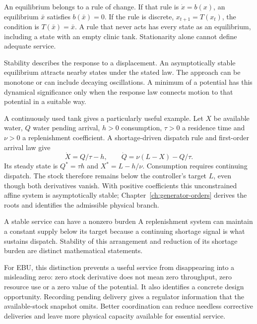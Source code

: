 An equilibrium belongs to a rule of change. If that rule is $\dot x=b(x)$, an equilibrium $\bar x$ satisfies $b(\bar x)=0$. If the rule is discrete, $x_{t+1}=T(x_t)$, the condition is $T(\bar x)=\bar x$. A rule that never acts has every state as an equilibrium, including a state with an empty clinic tank. Stationarity alone cannot define adequate service.

Stability describes the response to a displacement. An asymptotically stable equilibrium attracts nearby states under the stated law. The approach can be monotone or can include decaying oscillations. A minimum of a potential has this dynamical significance only when the response law connects motion to that potential in a suitable way.

A continuously used tank gives a particularly useful example. Let $X$ be available water, $Q$ water pending arrival, $h>0$ consumption, $\tau>0$ a residence time and $\nu>0$ a replenishment coefficient. A shortage-driven dispatch rule and first-order arrival law give
\begin{equation}\label{eq:operating-point-preview}
 \dot X=Q/\tau-h,\qquad \dot Q=\nu(L-X)-Q/\tau.
\end{equation}
Its steady state is $Q^*=\tau h$ and $X^*=L-h/\nu$. Consumption requires continuing dispatch. The stock therefore remains below the controller's target $L$, even though both derivatives vanish. With positive coefficients this unconstrained affine system is asymptotically stable; Chapter~\ref{ch:generator-orders} derives the roots and identifies the admissible physical branch.

\begin{intuitionbox}{A stable service can have a nonzero burden}
A replenishment system can maintain a constant supply below its target because a continuing shortage signal is what sustains dispatch. Stability of this arrangement and reduction of its shortage burden are distinct mathematical statements.
\end{intuitionbox}

For EBU, this distinction prevents a useful service from disappearing into a misleading zero: zero stock derivative does not mean zero throughput, zero resource use or a zero value of the potential. It also identifies a concrete design opportunity. Recording pending delivery gives a regulator information that the available-stock snapshot omits. Better coordination can reduce needless corrective deliveries and leave more physical capacity available for essential service.

